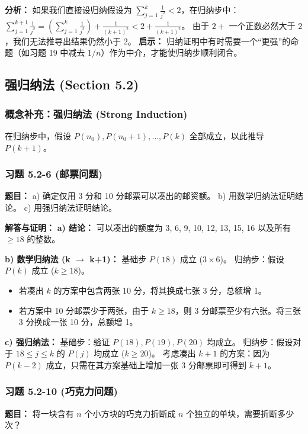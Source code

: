 \documentclass[11pt,UTF8]{article}
\begin{document}
\textbf{分析：}
如果我们直接设归纳假设为 $\sum_{j=1}^{k} \frac{1}{j^2} < 2$，在归纳步中：
$\sum_{j=1}^{k+1} \frac{1}{j^2} = (\sum_{j=1}^{k} \frac{1}{j^2}) + \frac{1}{(k+1)^2} < 2 + \frac{1}{(k+1)^2}$。
由于 $2 +$ 一个正数必然大于 $2$，我们无法推导出结果仍然小于 $2$。
\textbf{启示：} 归纳证明中有时需要一个“更强”的命题（如习题 19 中减去 $1/n$）作为中介，才能使归纳步顺利闭合。

\subsection{强归纳法 (Section 5.2)}

\subsubsection*{概念补充：强归纳法 (Strong Induction)}
在归纳步中，假设 $P(n_0), P(n_0+1), \dots, P(k)$ 全部成立，以此推导 $P(k+1)$。

\subsubsection*{习题 5.2-6 (邮票问题)}
\textbf{题目：} 
a) 确定仅用 3 分和 10 分邮票可以凑出的邮资额。
b) 用数学归纳法证明结论。
c) 用强归纳法证明结论。

\textbf{解答与证明：}
\textbf{a) 结论：} 可以凑出的额度为 3, 6, 9, 10, 12, 13, 15, 16 以及所有 $\ge 18$ 的整数。

\textbf{b) 数学归纳法 (k $\to$ k+1)：}
基础步 $P(18)$ 成立 ($3\times 6$)。
归纳步：假设 $P(k)$ 成立 ($k \ge 18$)。
\begin{itemize}
    \item 若凑出 $k$ 的方案中包含两张 10 分，将其换成七张 3 分，总额增 1。
    \item 若方案中 10 分邮票少于两张，由于 $k \ge 18$，则 3 分邮票至少有六张。将三张 3 分换成一张 10 分，总额增 1。
\end{itemize}

\textbf{c) 强归纳法：}
基础步：验证 $P(18), P(19), P(20)$ 均成立。
归纳步：假设对于 $18 \le j \le k$ 的 $P(j)$ 均成立 ($k \ge 20$)。
考虑凑出 $k+1$ 的方案：因为 $P(k-2)$ 成立，只需在其方案基础上增加一张 3 分邮票即可得到 $k+1$。

\subsubsection*{习题 5.2-10 (巧克力问题)}
\textbf{题目：} 将一块含有 $n$ 个小方块的巧克力折断成 $n$ 个独立的单块，需要折断多少次？
\end{document}
